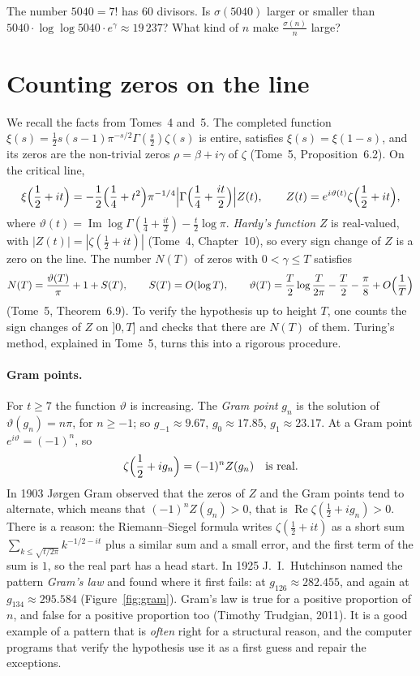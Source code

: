 \begin{think}
The number $5040=7!$ has $60$ divisors. Is $\sigma(5040)$ larger or smaller than $5040\cdot\log\log5040\cdot e^\gamma\approx19\,237$? What kind of $n$
make $\frac{\sigma(n)}n$ large?
\end{think}

\section{Counting zeros on the line}

We recall the facts from Tomes~4 and~5. The completed function $\xi(s)=\frac12s(s-1)\pi^{-s/2}\Gamma(\frac s2)\zeta(s)$ is entire, satisfies
$\xi(s)=\xi(1-s)$, and its zeros are the non-trivial zeros $\rho=\beta+i\gamma$ of $\zeta$ (Tome~5, Proposition~6.2). On the critical line,
\[
\xi\Bigl(\frac12+it\Bigr)=-\frac12\Bigl(\frac14+t^2\Bigr)\pi^{-1/4}\Bigl|\Gamma\Bigl(\frac14+\frac{it}2\Bigr)\Bigr|Z(t),\qquad Z(t)=e^{i\vartheta(t)}\zeta\Bigl(\frac12+it\Bigr),
\]
where $\vartheta(t)=\operatorname{Im}\log\Gamma(\frac14+\frac{it}2)-\frac t2\log\pi$. \emph{Hardy's function} $Z$ is real-valued, with $|Z(t)|=|\zeta(\frac12+it)|$
(Tome~4, Chapter~10), so every sign change of $Z$ is a zero on the line. The number $N(T)$ of zeros with $0<\gamma\le T$ satisfies
\[
N(T)=\frac{\vartheta(T)}\pi+1+S(T),\qquad S(T)=O(\log T),\qquad\vartheta(T)=\frac T2\log\frac T{2\pi}-\frac T2-\frac\pi8+O\Bigl(\frac1T\Bigr)
\]
(Tome~5, Theorem~6.9). To verify the hypothesis up to height $T$, one counts the sign changes of $Z$ on $]0,T]$ and checks that there are $N(T)$ of
them. Turing's method, explained in Tome~5, turns this into a rigorous procedure.

\paragraph{Gram points.} For $t\ge7$ the function $\vartheta$ is increasing. The \emph{Gram point} $g_n$ is the solution of $\vartheta(g_n)=n\pi$, for
$n\ge-1$; so $g_{-1}\approx9.67$, $g_0\approx17.85$, $g_1\approx23.17$. At a Gram point $e^{i\vartheta}=(-1)^n$, so
\[
\zeta\Bigl(\frac12+ig_n\Bigr)=(-1)^nZ(g_n)\quad\text{is real}.
\]
In 1903 J\o rgen Gram observed that the zeros of $Z$ and the Gram points tend to alternate, which means that $(-1)^nZ(g_n)>0$, that is
$\operatorname{Re}\zeta(\frac12+ig_n)>0$. There is a reason: the Riemann--Siegel formula writes $\zeta(\frac12+it)$ as a short sum
$\sum_{k\le\sqrt{t/2\pi}}k^{-1/2-it}$ plus a similar sum and a small error, and the first term of the sum is $1$, so the real part has a head start. In 1925
J.~I.~Hutchinson named the pattern \emph{Gram's law} and found where it first fails: at $g_{126}\approx282.455$, and again at $g_{134}\approx295.584$
(Figure~\ref{fig:gram}). Gram's law is true for a positive proportion of $n$, and false for a positive proportion too (Timothy Trudgian, 2011). It is a good example of a
pattern that is \emph{often} right for a structural reason, and the computer programs that verify the hypothesis use it as a first guess and repair the
exceptions.


